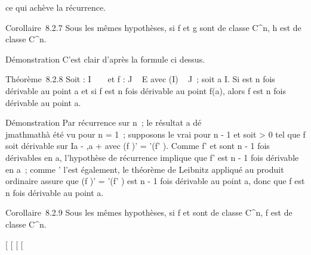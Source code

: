 \documentclass[]{article}
\begin{document}
ce qui achève la récurrence.

Corollaire~8.2.7 Sous les mêmes hypothèses, si f et g sont de classe
C^n, h est de classe C^n.

Démonstration C'est clair d'après la formule ci dessus.

Théorème~8.2.8 Soit \phi : I \rightarrow~ ~ et f : J \rightarrow~ E avec \phi(I) \subset~ J~; soit a \in I.
Si \phi est n fois dérivable au point a et si f est n fois dérivable au
point f(a), alors f \cdot \phi est n fois dérivable au point a.

Démonstration Par récurrence sur n~; le résultat a dé\\jmathmathà été vu pour n =
1~; supposons le vrai pour n - 1 et soit \eta \textgreater{} 0 tel que f \cdot
\phi soit dérivable sur I\bigcap{]}a - \eta,a + \eta{[} avec (f \cdot \phi)' = \phi'(f' \cdot \phi).
Comme f' et \phi sont n - 1 fois dérivables en a, l'hypothèse de récurrence
implique que f' \cdot \phi est n - 1 fois dérivable en a~; comme \phi' l'est
également, le théorème de Leibnitz appliqué au produit ordinaire assure
que (f \cdot \phi)' = \phi'(f' \cdot \phi) est n - 1 fois dérivable au point a, donc que
f \cdot \phi est n fois dérivable au point a.

Corollaire~8.2.9 Sous les mêmes hypothèses, si f et \phi sont de classe
C^n, f \cdot \phi est de classe C^n.

{[}
{[}
{[}
{[}
\end{document}
